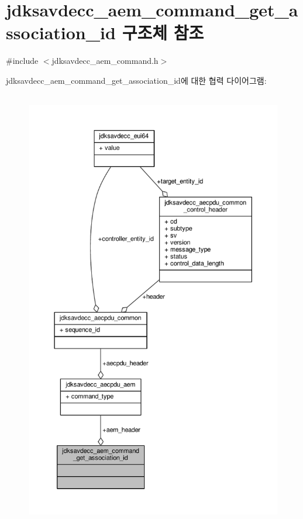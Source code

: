 \hypertarget{structjdksavdecc__aem__command__get__association__id}{}\section{jdksavdecc\+\_\+aem\+\_\+command\+\_\+get\+\_\+association\+\_\+id 구조체 참조}
\label{structjdksavdecc__aem__command__get__association__id}


{\ttfamily \#include $<$jdksavdecc\+\_\+aem\+\_\+command.\+h$>$}



jdksavdecc\+\_\+aem\+\_\+command\+\_\+get\+\_\+association\+\_\+id에 대한 협력 다이어그램\+:
\nopagebreak
\begin{figure}[H]
\begin{center}
\leavevmode
\includegraphics[height=550pt]{structjdksavdecc__aem__command__get__association__id__coll__graph}
\end{center}
\end{figure}

